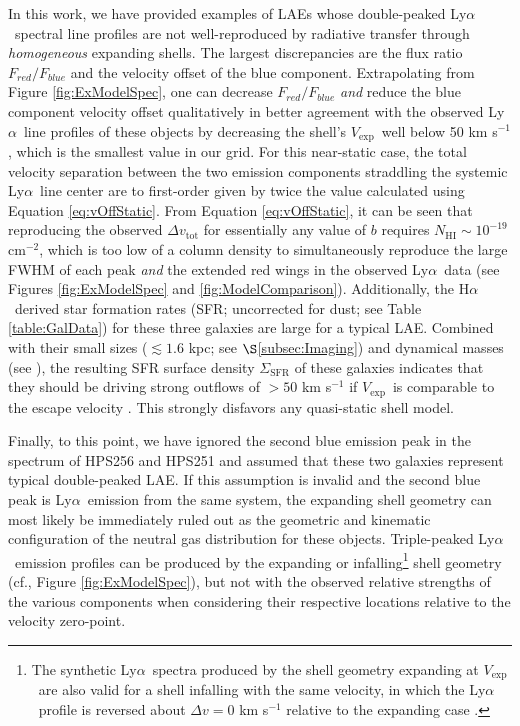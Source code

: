 \documentclass{emulateapj}
\newcommand{\lya}{Ly$\alpha$}
\newcommand{\ha}{H$\alpha$}
\def\vexp{$V_{\mathrm{exp}}$}
\begin{document}
In this work, we have provided examples of LAEs whose double-peaked \lya\ spectral line profiles are not well-reproduced by radiative transfer through \textit{homogeneous} expanding shells. The largest discrepancies are the flux ratio $F_{red} / F_{blue}$ and the velocity offset of the blue component. Extrapolating from Figure \ref{fig:ExModelSpec}, one can decrease $F_{red} / F_{blue}$ \textit{and} reduce the blue component velocity offset qualitatively in better agreement with the observed \lya\ line profiles of these objects by decreasing the shell's \vexp\ well below 50 km s$^{-1}$, which is the smallest value in our grid. For this near-static case, the total velocity separation between the two emission components straddling the systemic \lya\ line center are to first-order given by twice the value calculated using Equation \ref{eq:vOffStatic}. From Equation \ref{eq:vOffStatic}, it can be seen that reproducing the observed $\Delta v_{\mathrm{tot}}$ for essentially any value of $b$ requires $N_{\mathrm{HI}} \sim 10^{-19}$ cm$^{-2}$, which is too low of a column density to simultaneously reproduce the large FWHM of each peak \textit{and} the extended red wings in the observed \lya\ data (see Figures \ref{fig:ExModelSpec} and \ref{fig:ModelComparison}). Additionally, the \ha\ derived star formation rates (SFR; uncorrected for dust; see Table \ref{table:GalData}) for these three galaxies are large for a typical LAE. Combined with their small sizes ($\lesssim1.6$ kpc; see $\S$\ref{subsec:Imaging}) and dynamical masses (see \citealp{rhoads2013}), the resulting SFR surface density $\Sigma_{\mathrm{SFR}}$ of these galaxies indicates that they should be driving strong outflows of $>50$ km s$^{-1}$ if \vexp\ is comparable to the escape velocity \citep{heckman2002,newman2012}. This strongly disfavors any quasi-static shell model. 

Finally, to this point, we have ignored the second blue emission peak in the spectrum of HPS256 and HPS251 and assumed that these two galaxies represent typical double-peaked LAE. If this assumption is invalid and the second blue peak is \lya\ emission from the same system, the expanding shell geometry can most likely be immediately ruled out as the geometric and kinematic configuration of the neutral gas distribution for these objects. Triple-peaked \lya\ emission profiles can be produced by the expanding or infalling\footnote[14]{The synthetic \lya\ spectra produced by the shell geometry expanding at \vexp\ are also valid for a shell infalling with the same velocity, in which the \lya\ profile is reversed about $\Delta v = 0$ km s$^{-1}$ relative to the expanding case \citep{verhamme2006}.} shell geometry (cf., Figure \ref{fig:ExModelSpec}), but not with the observed relative strengths of the various components when considering their respective locations relative to the velocity zero-point.  
\end{document}
